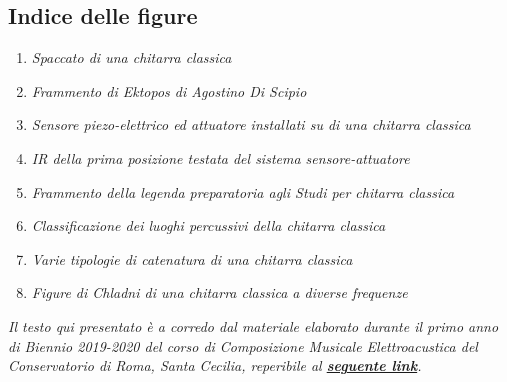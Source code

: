 \documentclass[oneside]{article}
\begin{document}
\begin{multicols*}{2}

\section{ Indice delle figure}

\begin{enumerate}
\item \emph{Spaccato di una chitarra classica}
\item \emph{Frammento di \textit{Ektopos} di Agostino Di Scipio}
\item \emph{Sensore piezo-elettrico ed attuatore installati su di una chitarra classica}
\item \emph{IR della prima posizione testata del sistema sensore-attuatore}
\item \emph{Frammento della legenda preparatoria agli Studi per chitarra classica}
\item \emph{Classificazione dei luoghi percussivi della chitarra classica}
\item \emph{Varie tipologie di \textit{catenatura} di una chitarra classica}
\item \emph{Figure di Chladni di una chitarra classica a diverse frequenze}

\end{enumerate}

\end{multicols*}

\textit{Il testo qui presentato è a corredo dal materiale elaborato durante il primo anno di Biennio 2019-2020 del corso di Composizione Musicale Elettroacustica del Conservatorio di Roma, Santa Cecilia, reperibile al \textbf{\href{https://github.com/SMERM/BN-Tedesco/}{seguente link}}.}
\end{document}
